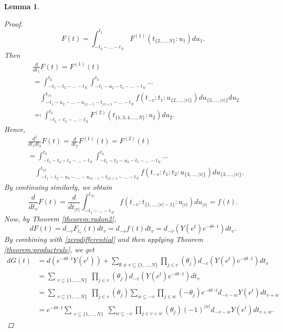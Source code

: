 \documentclass[english, a4paper, 12pt,reqno]{amsart}
\newtheorem{lemma}[defi]{Lemma}
\begin{document}
\begin{lemma}
\begin{proof}
$$F(t) = \int_{-t_2-\dots-t_N}^{t_1} F^{(1)}(t_{\{2,\dots,N\}}: u_1) du_1.$$
Then
\begin{equation*}
\begin{split}
 &\frac{d}{dt_1} F(t) = F^{(1)} (t) \\
 &= \int_{-t_1-t_3-\dots -t_N}^{t_2} \int_{-t_1-u_2-t_4-\dots -t_N}^{t_3} \dots\\
 &\quad\int_{-t_1 - u_2 -\dots -u_{|v|-1} - t_{|v|+1}-\dots- t_N}^{t_{|v|}} f(t_{-v}:t_1:u_{\{2,\dots,|v|\}})  du_{\{3,\dots,|v|\}}du_2\\
 & \eqqcolon \int_{-t_1-t_3-\dots -t_N}^{t_2} F^{(2)}(t_{\{1,3,4,\dots,N\}}:u_2) du_2.
 \end{split}
 \end{equation*}
 Hence,
 \begin{equation*}
 \begin{split}
 &\frac{d^2}{dt_1dt_2} F(t) = \frac{d}{dt_2} F^{(1)}(t) = F^{(2)} (t)\\
 &= \int_{-t_1-t_2-t_4-\dots-t_N}^{t_3} \int_{-t_1-t_2-u_3-t_5-\dots -t_N}^{t_4} \dots\\
 &\quad \int_{-t_1-t_2-u_3-\dots -u_{|v|-1}-t_{|v|+1} - \dots -t_N}^{t_{|v|}} f(t_{-v}: t_1:t_2: u_{\{3,\dots,|v|\}}) du_{\{3,\dots,|v|\}}.
 \end{split}
 \end{equation*}
 By continuing similarly, we obtain 
 $$\frac{d}{dt_v} F(t) = \frac{d}{dt_{|v|}} \int_{-t_1-\dots-t_N}^{t_{|v|}} f(t_{-v}:t_{\{1,\dots,|v|-1\}}:u_{|v|}) du_{|v|}= f(t).$$
 Now, by Theorem \ref{theorem:radon2}, 
 $$dF(t) = d_{-v}F_{t_v}(t)dt_v = d_{-v} f(t) dt_v = d_{-v} \left(Y(e^t) e^{-\Theta\cdot t} \right) dt_v.$$
By combining with \eqref{zerodifferential} and then applying Theorem \ref{theorem:productrule}, we get
\begin{equation*}
\begin{split}
dG(t) &= d\left(e^{-\Theta\cdot t} Y(e^t)\right) + \sum_{\emptyset\neq v \subseteq \{1,\dots,N\}}\prod_{j\in v}(\theta_j) d_{-v} \left(Y(e^t) e^{-\Theta\cdot t} \right) dt_v\\
&= \sum_{\substack{v\subseteq \{1,\dots,N\}}}\prod_{j\in v}(\theta_j) d_{-v} \left(Y(e^t) e^{-\Theta\cdot t} \right) dt_v\\
&= \sum_{\substack{v\subseteq \{1,\dots,N\}}}\prod_{j\in v}(\theta_j) \sum_{w\subseteq -v} \prod_{j\in w}(-\theta_j) e^{-\Theta\cdot t} d_{-v-w} Y(e^t) dt_{v+w}\\
&= e^{-\Theta\cdot t}\sum_{\substack{v\subseteq \{1,\dots,N\}}} \sum_{w\subseteq -v} \prod_{j\in v+ w}(\theta_j)(-1)^{|w|} d_{-v-w} Y(e^t) dt_{v+w}.

\end{split}
\end{equation*}
\end{proof}
\end{lemma}
\end{document}
